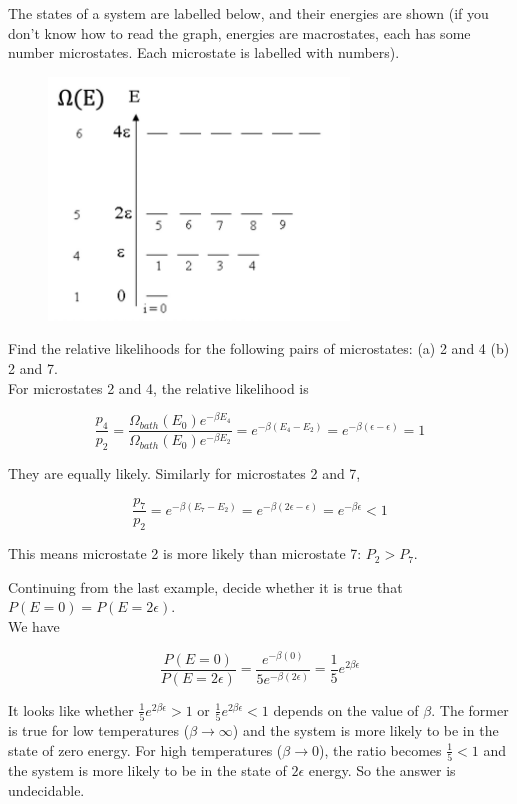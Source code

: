 \begin{texample}
	The states of a system are labelled below, and their energies are shown (if you don't know how to read the graph, energies are macrostates, each has some number microstates. Each microstate is labelled with numbers).
	
	\begin{figure}[H]
		\centering
		\includegraphics[width=80mm]{14.png}
	\end{figure}
	
	Find the relative likelihoods for the following pairs of microstates: (a) 2 and 4 (b) 2 and 7. \\
	
	For microstates 2 and 4, the relative likelihood is
	
	$$\frac{p_4}{p_2}=\frac{\Omega_{bath}(E_0)e^{-\beta E_4}}{\Omega_{bath}(E_0)e^{-\beta E_2}}=e^{-\beta(E_4-E_2)}=e^{-\beta(\epsilon-\epsilon)}=1$$
	
	They are equally likely. Similarly for microstates 2 and 7,
	
	$$\frac{p_7}{p_2}=e^{-\beta(E_7-E_2)}=e^{-\beta(2\epsilon-\epsilon)}=e^{-\beta\epsilon}<1$$
	
	This means microstate 2 is more likely than microstate 7: $P_2>P_7$.
\end{texample}

\begin{texample}
	Continuing from the last example, decide whether it is true that $P(E=0)=P(E=2\epsilon)$. \\
	
	We have
	
	$$\frac{P(E=0)}{P(E=2\epsilon)}=\frac{e^{-\beta(0)}}{5e^{-\beta(2\epsilon)}}=\frac15 e^{2\beta\epsilon}$$
	
	It looks like whether $\frac15 e^{2\beta\epsilon} >1$ or $\frac15 e^{2\beta\epsilon} < 1$ depends on the value of $\beta$. The former is true for low temperatures ($\beta\to\infty$) and the system is more likely to be in the state of zero energy. For high temperatures ($\beta\to0$), the ratio becomes $\frac{1}{5}<1$ and the system is more likely to be in the state of $2\epsilon$ energy. So the answer is undecidable.
\end{texample}

